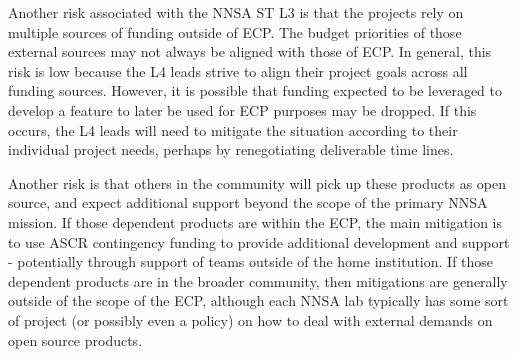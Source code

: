 Another risk associated with the NNSA ST L3 is that the projects rely
on multiple sources of funding outside of ECP. The budget priorities of 
those external sources may not always be aligned with those of ECP. In general,
this risk is low because the L4 leads strive to align their project goals across 
all funding sources. However, it is possible that funding expected to be leveraged
to develop a feature to later be used for ECP purposes may be dropped. If this 
occurs, the L4 leads will need to mitigate the situation according to their 
individual project needs, perhaps by renegotiating deliverable time lines.

Another risk is that others in the community will pick up these
products as open source, and expect additional support beyond the
scope of the primary NNSA mission. If those dependent products are within the
ECP, the main mitigation is to use ASCR contingency funding to provide
additional development and support - potentially through support of teams
outside of the home institution. If those dependent products are in
the broader community, then mitigations are generally outside of the scope
of the ECP, although each NNSA lab typically has some sort of project
(or possibly even a policy) on how to deal with external demands on
open source products.




